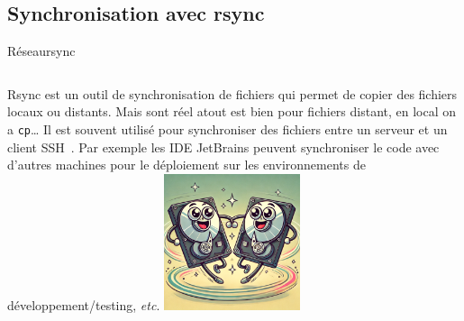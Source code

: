 \documentclass{beamer}
\begin{document}
    \subsection{Synchronisation avec rsync}\label{subsec:rsync-syncro}

    \begin{frame}{Réseau}{rsync}
        \begin{columns}
            Rsync est un outil de synchronisation de fichiers qui permet de copier des fichiers locaux ou distants.
            Mais sont réel atout est bien pour fichiers distant, en local on a \lstinline{cp}\ldots
            \bigbreak
            Il est souvent utilisé pour synchroniser des fichiers entre un serveur et un client SSH~.
            \bigbreak
            Par exemple les IDE JetBrains peuvent synchroniser le code avec d'autres machines pour le déploiement sur les environnements de développement/testing, \textit{etc}.
            \centering
            \includegraphics[width=4cm]{image/hdd-synchronous}
        \end{columns}
    \end{frame}
\end{document}
